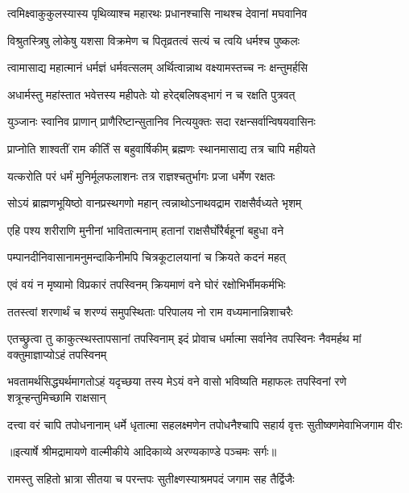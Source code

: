\twolineshloka
{त्वमिक्ष्वाकुकुलस्यास्य पृथिव्याश्च महारथः}
{प्रधानश्चासि नाथश्च देवानां मघवानिव} %

\twolineshloka
{विश्रुतस्त्रिषु लोकेषु यशसा विक्रमेण च}
{पितृव्रतत्वं सत्यं च त्वयि धर्मश्च पुष्कलः} %

\twolineshloka
{त्वामासाद्य महात्मानं धर्मज्ञं धर्मवत्सलम्}
{अर्थित्वान्नाथ वक्ष्यामस्तच्च नः क्षन्तुमर्हसि} %

\twolineshloka
{अधार्मस्तु महांस्तात भवेत्तस्य महीपतेः}
{यो हरेद्बलिषड्भागं न च रक्षति पुत्रवत्} %

\twolineshloka
{युञ्जानः स्वानिव प्राणान् प्राणैरिष्टान्सुतानिव}
{नित्ययुक्तः सदा रक्षन्सर्वान्विषयवासिनः} %

\twolineshloka
{प्राप्नोति शाश्वतीं राम कीर्तिं स बहुवार्षिकीम्}
{ब्रह्मणः स्थानमासाद्य तत्र चापि महीयते} %

\twolineshloka
{यत्करोति परं धर्मं मुनिर्मूलफलाशनः}
{तत्र राज्ञश्चतुर्भागः प्रजा धर्मेण रक्षतः} %

\twolineshloka
{सोऽयं ब्राह्मणभूयिष्ठो वानप्रस्थगणो महान्}
{त्वन्नाथोऽनाथवद्राम राक्षसैर्वध्यते भृशम्} %

\twolineshloka
{एहि पश्य शरीराणि मुनीनां भावितात्मनाम्}
{हतानां राक्षसैर्घोरैर्बहूनां बहुधा वने} %

\twolineshloka
{पम्पानदीनिवासानामनुमन्दाकिनीमपि}
{चित्रकूटालयानां च क्रियते कदनं महत्} %

\twolineshloka
{एवं वयं न मृष्यामो विप्रकारं तपस्विनम्}
{क्रियमाणं वने घोरं रक्षोभिर्भीमकर्मभिः} %

\twolineshloka
{ततस्त्वां शरणार्थं च शरण्यं समुपस्थिताः}
{परिपालय नो राम वध्यमानान्निशाचरैः} %

\threelineshloka
{एतच्छ्रुत्वा तु काकुत्स्थस्तापसानां तपस्विनाम्}
{इदं प्रोवाच धर्मात्मा सर्वानेव तपस्विनः}
{नैवमर्हथ मां वक्तुमाज्ञाप्योऽहं तपस्विनम्} %

\threelineshloka
{भवतामर्थसिद्ध्यर्थमागतोऽहं यदृच्छया}
{तस्य मेऽयं वने वासो भविष्यति महाफलः}
{तपस्विनां रणे शत्रून्हन्तुमिच्छामि राक्षसान्} %

\fourlineindentedshloka
{दत्त्वा वरं चापि तपोधनानाम्}
{धर्मे धृतात्मा सहलक्ष्मणेन}
{तपोधनैश्चापि सहार्य वृत्तः}
{सुतीष्क्णमेवाभिजगाम वीरः} %


{॥इत्यार्षे श्रीमद्रामायणे वाल्मीकीये आदिकाव्ये अरण्यकाण्डे पञ्चमः सर्गः॥}


\twolineshloka
{रामस्तु सहितो भ्रात्रा सीतया च परन्तपः}
{सुतीक्ष्णस्याश्रमपदं जगाम सह तैर्द्विजैः} %

